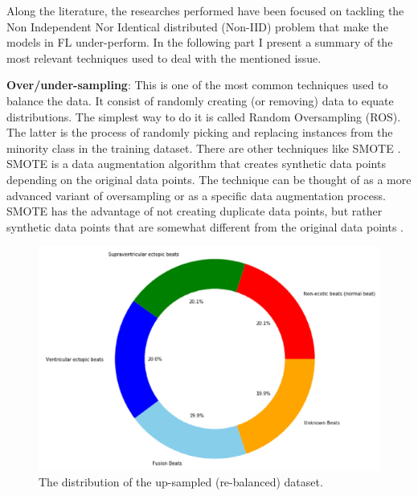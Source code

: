 Along the literature, the researches performed have been focused on tackling the Non Independent Nor Identical distributed (Non-IID) problem that make the models in FL under-perform. In the following part I present a summary of the most relevant techniques used to deal with the mentioned issue.

\textbf{Over/under-sampling}: This is one of the most common techniques used to balance the data. It consist of randomly creating (or removing) data to equate distributions. The simplest way to do it is called Random Oversampling (ROS). The latter is the process of randomly picking and replacing instances from the minority class in the training dataset. There are other techniques like SMOTE \cite{metrics_ecg1}. SMOTE is a data augmentation algorithm that creates synthetic data points depending on the original data points. The technique can be thought of as a more advanced variant of oversampling or as a specific data augmentation process. SMOTE has the advantage of not creating duplicate data points, but rather synthetic data points that are somewhat different from the original data points \cite{imbalance_data3}.

\begin{figure}[H]
\centering
\includegraphics[scale=0.6]{img/metrics_ecg1_ROS.PNG}
\caption{The distribution of the up-sampled (re-balanced) dataset. \cite{metrics_ecg1}}
\label{fig:metrics_ecg1_ROS}
\end{figure}
